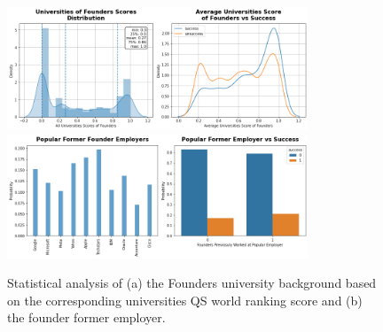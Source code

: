 \documentclass{article}
\begin{document}

\pagebreak

\begin{figure}[h]
	\centering
	\includegraphics[width=0.8\textwidth]{figures/university_distribution_average_score}
	\includegraphics[width=0.8\textwidth]{figures/employer_popular_popoluar_vs_success}
	\caption{Statistical analysis of (a) the Founders university background based on the corresponding universities QS world ranking score and (b) the founder former employer.}
	\label{fig:founder_statistics}
\end{figure}
\end{document}
